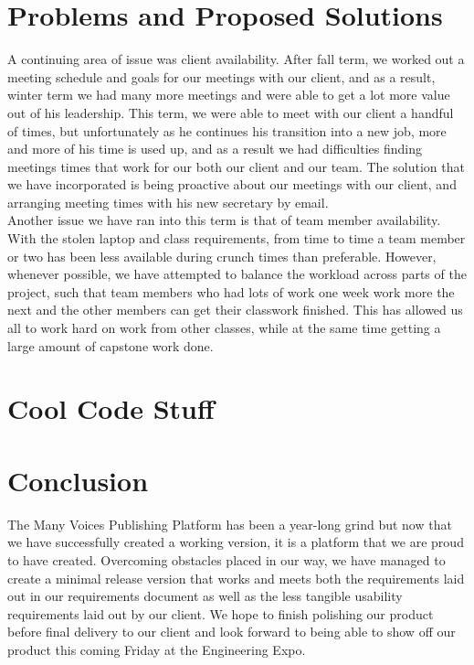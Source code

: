 \documentclass[onecolumn, draftclsnofoot,10pt, compsoc]{IEEEtran}
\begin{document}
\newpage

\section{Problems and Proposed Solutions}

\noindent A continuing area of issue was client availability. After fall term, we worked out a meeting schedule
and goals for our meetings with our client, and as a result, winter term we had many more meetings and
were able to get a lot more value out of his leadership. This term, we were able to meet with
our client a handful of times, but unfortunately as he continues his transition into a new job,
more and more of his time is used up, and as a result we had difficulties finding
meetings times that work for our both our client and our team. The solution that we have incorporated is being proactive
about our meetings with our client, and arranging meeting times with his new secretary by email.\\

\noindent Another issue we have ran into this term is that of team member availability.
With the stolen laptop and class requirements, from time to time a team member or two has been less
available during crunch times than preferable. However, whenever possible, we have attempted to
balance the workload across parts of the project, such that team members who had lots of work one week
work more the next and the other members can get their classwork finished. This has allowed us all
to work hard on work from other classes, while at the same time getting a large amount of
capstone work done. \\

\newpage

\section{Cool Code Stuff}

\section{Conclusion}
The Many Voices Publishing Platform has been a year-long grind but now that we
have successfully created a working version, it is a platform that we are proud
to have created. Overcoming obstacles placed in our way, we have managed to create
a minimal release version that works and meets both the requirements laid out
in our requirements document as well as the less tangible usability requirements
laid out by our client. We hope to finish polishing our product before final
delivery to our client and look forward to being able to show off our product
this coming Friday at the Engineering Expo.
\end{document}
